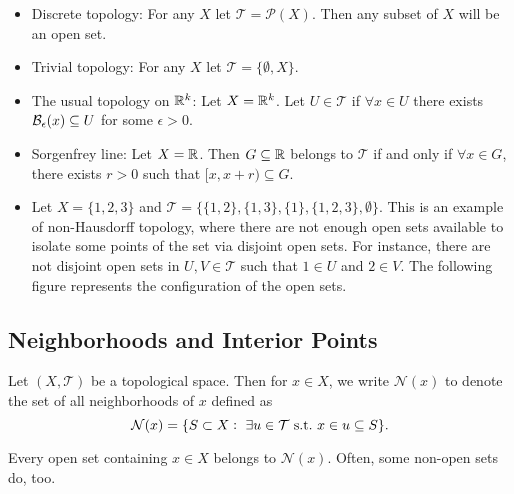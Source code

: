 \begin{itemize}
	\item Discrete topology: For any $X$ let $\mathcal{T} = \mathcal{P}(X)$. Then any subset of $X$ will be an open set.
	\item Trivial topology: For any $X$ let $\mathcal{T} = \{ \emptyset, X \}$.
	\item The usual topology on $\mathbb{R}^k$: Let $X = \mathbb{R}^k$. Let $U \in \mathcal{T}$ if $\forall x\in U$ there exists $\mathcal{B}_{\epsilon}(x) \subseteq U$ for some $\epsilon>0$.
	\item Sorgenfrey line: Let $X= \mathbb{R}$. Then $G\subseteq \mathbb{R}$ belongs to $\mathcal{T}$ if and only if $\forall x\in G$, there exists $r>0$ such that $[x,x+r) \subseteq G$.
	\item Let $X = \{1,2,3\}$ and $\mathcal{T}=\{ \{1,2\}, \{1,3\}, \{1\}, \{1,2,3\},\emptyset \}$. This is an example of non-Hausdorff topology, where there are not enough open sets available to isolate some points of the set via disjoint open sets. For instance, there are not disjoint open sets in $U,V \in \mathcal{T}$ such that $1\in U$ and $2\in V$. The following figure represents the configuration of the open sets.
	
\end{itemize}





\subsection{Neighborhoods and Interior Points}
\begin{definition}
	Let $(X,\mathcal{T})$ be a topological space. Then for $x\in X$, we write $\mathcal{N}(x)$ to denote the set of all neighborhoods of $x$ defined as 
	\[ \mathcal{N}(x) = \{ S \subset X:\ \exists u\in\mathcal{T} \ \text{s.t.}\  x\in u \subseteq S \}. \]
\end{definition}
Every open set containing $x\in X$ belongs to $\mathcal{N}(x)$. Often, some non-open sets do, too.

